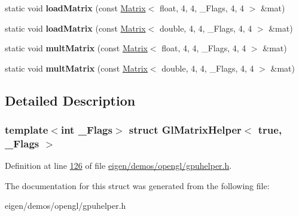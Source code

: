 \begin{DoxyCompactItemize}
static void {\bfseries load\+Matrix} (const \hyperlink{group___core___module_class_eigen_1_1_matrix}{Matrix}$<$ float, 4, 4, \+\_\+\+Flags, 4, 4 $>$ \&mat)
\item 
\mbox{\label{struct_gl_matrix_helper_3_01true_00_01___flags_01_4_a5707822f8752daa0fcf99de28c28f721}} 
static void {\bfseries load\+Matrix} (const \hyperlink{group___core___module_class_eigen_1_1_matrix}{Matrix}$<$ double, 4, 4, \+\_\+\+Flags, 4, 4 $>$ \&mat)
\item 
\mbox{\label{struct_gl_matrix_helper_3_01true_00_01___flags_01_4_a03e37f4f88e9ddfdbecd1cb1b4888ff2}} 
static void {\bfseries mult\+Matrix} (const \hyperlink{group___core___module_class_eigen_1_1_matrix}{Matrix}$<$ float, 4, 4, \+\_\+\+Flags, 4, 4 $>$ \&mat)
\item 
\mbox{\label{struct_gl_matrix_helper_3_01true_00_01___flags_01_4_a13ebaff15d47f5da6142a76e8f070bdc}} 
static void {\bfseries mult\+Matrix} (const \hyperlink{group___core___module_class_eigen_1_1_matrix}{Matrix}$<$ double, 4, 4, \+\_\+\+Flags, 4, 4 $>$ \&mat)
\end{DoxyCompactItemize}


\subsection{Detailed Description}
\subsubsection*{template$<$int \+\_\+\+Flags$>$\newline
struct Gl\+Matrix\+Helper$<$ true, \+\_\+\+Flags $>$}



Definition at line \hyperlink{eigen_2demos_2opengl_2gpuhelper_8h_source_l00126}{126} of file \hyperlink{eigen_2demos_2opengl_2gpuhelper_8h_source}{eigen/demos/opengl/gpuhelper.\+h}.



The documentation for this struct was generated from the following file\+:\begin{DoxyCompactItemize}
\item 
eigen/demos/opengl/gpuhelper.\+h\end{DoxyCompactItemize}
